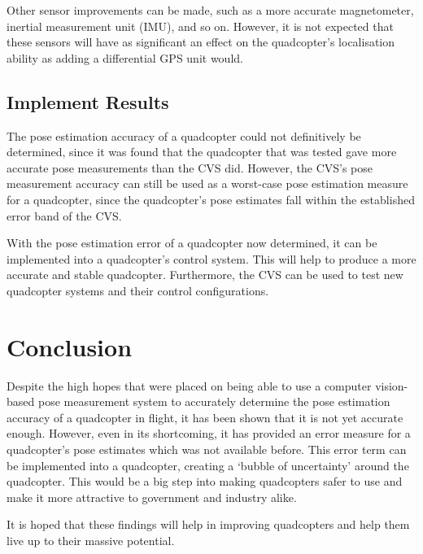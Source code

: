 Other sensor improvements can be made, such as a more accurate magnetometer, inertial measurement unit (IMU), and so on. However, it is not expected that these sensors will have as significant an effect on the quadcopter's localisation ability as adding a differential GPS unit would. 

\subsection{Implement Results}

The pose estimation accuracy of a quadcopter could not definitively be determined, since it was found that the quadcopter that was tested gave more accurate pose measurements than the CVS did. However, the CVS's pose measurement accuracy can still be used as a worst-case pose estimation measure for a quadcopter, since the quadcopter's pose estimates fall within the established error band of the CVS.\@ 

With the pose estimation error of a quadcopter now determined, it can be implemented into a quadcopter's control system. This will help to produce a more accurate and stable quadcopter. Furthermore, the CVS can be used to test new quadcopter systems and their control configurations. 

\section{Conclusion}

Despite the high hopes that were placed on being able to use a computer vision-based pose measurement system to accurately determine the pose estimation accuracy of a quadcopter in flight, it has been shown that it is not yet accurate enough. However, even in its shortcoming, it has provided an error measure for a quadcopter's pose estimates which was not available before. This error term can be implemented into a quadcopter, creating a `bubble of uncertainty' around the quadcopter. This would be a big step into making quadcopters safer to use and make it more attractive to government and industry alike. 

It is hoped that these findings will help in improving quadcopters and help them live up to their massive potential. 
